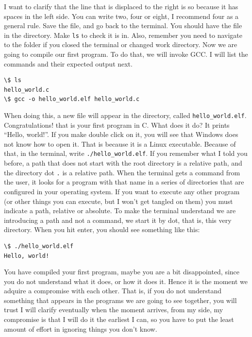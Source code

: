 \documentclass[a4paper]{article}
\begin{document}
I want to clarify that the line that is displaced to the right is so because it
has spaces in the left side. You can write two, four or eight, I recommend four
as a general rule. Save the file, and go back to the terminal. You should have
the file in the directory. Make \verb!ls! to check it is in. Also, remember you
need to navigate to the folder if you closed the terminal or changed work
directory. Now we are going to compile our first program. To do that, we will
invoke GCC. I will list the commands and their expected output next.

\noindent
\begin{minipage}[H]{\linewidth}
\mbox{}
\begin{lstlisting}[style=terminalStyle]
\$ ls
hello_world.c
\$ gcc -o hello_world.elf hello_world.c
\end{lstlisting}
\end{minipage}

When doing this, a new file will appear in the directory, called
\verb!hello_world.elf!. Congratulations! that is your first program in C. What
does it do? It prints ``Hello, world!''. If you make double click on it, you
will see that Windows does not know how to open it. That is because it is a
Linux executable. Because of that, in the terminal, write
\verb!./hello_world.elf!. If you remember what I told you before, a path that
does not start with the root directory is a relative path, and the directory
dot \verb!.! is a relative path. When the terminal gets a command from the user,
it looks for a program with that name in a series of directories that are
configured in your operating system. If you want to execute any other program
(or other things you can execute, but I won't get tangled on them) you must
indicate a path, relative or absolute. To make the terminal understand we are
introducing a path and not a command, we start it by dot, that is, this very
directory. When you hit enter, you should see something like this:

\noindent
\begin{minipage}[H]{\linewidth}
\mbox{}
\begin{lstlisting}[style=terminalStyle]
\$ ./hello_world.elf
Hello, world!
\end{lstlisting}
\end{minipage}

You have compiled your first program, maybe you are a bit disappointed,
since you do not understand what it does, or how it does it. Hence it is the
moment we adquire a compromise with each other. That is, if you do not
understand something that appears in the programs we are going to see together,
you will trust I will clarify eventually when the moment arrives, from my side,
my compromise is that I will do it the earliest I can, so you have to put the
least amount of effort in ignoring things you don't know.
\end{document}
